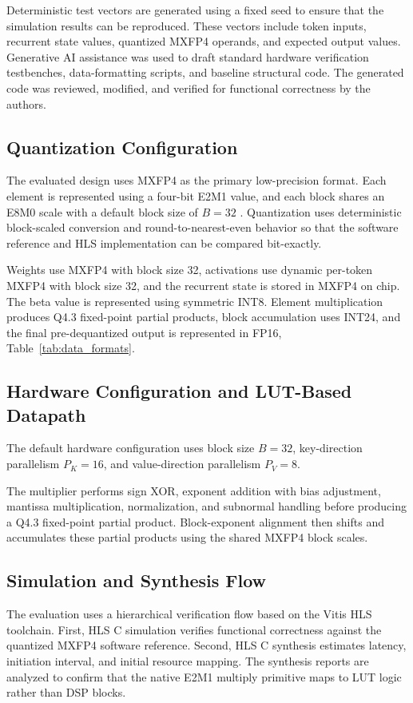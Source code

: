 ﻿\documentclass[conference]{IEEEtran}
\begin{document}
Deterministic test vectors are generated using a fixed seed to ensure that the simulation results can be reproduced. These vectors include token inputs, recurrent state values, quantized MXFP4 operands, and expected output values. Generative AI assistance was used to draft standard hardware verification testbenches, data-formatting scripts, and baseline structural code. The generated code was reviewed, modified, and verified for functional correctness by the authors.

\subsection{Quantization Configuration}
The evaluated design uses MXFP4 as the primary low-precision format. Each element is represented using a four-bit E2M1 value, and each block shares an E8M0 scale with a default block size of $B=32$ \cite{b12}. Quantization uses deterministic block-scaled conversion and round-to-nearest-even behavior so that the software reference and HLS implementation can be compared bit-exactly.

Weights use MXFP4 with block size 32, activations use dynamic per-token MXFP4 with block size 32, and the recurrent state is stored in MXFP4 on chip. The beta value is represented using symmetric INT8. Element multiplication produces Q4.3 fixed-point partial products, block accumulation uses INT24, and the final pre-dequantized output is represented in FP16, Table~\ref{tab:data_formats}.

\subsection{Hardware Configuration and LUT-Based Datapath}
The default hardware configuration uses block size $B=32$, key-direction parallelism $P_K=16$, and value-direction parallelism $P_V=8$.

The multiplier performs sign XOR, exponent addition with bias adjustment, mantissa multiplication, normalization, and subnormal handling before producing a Q4.3 fixed-point partial product. Block-exponent alignment then shifts and accumulates these partial products using the shared MXFP4 block scales.

\subsection{Simulation and Synthesis Flow}
The evaluation uses a hierarchical verification flow based on the Vitis HLS toolchain. First, HLS C simulation verifies functional correctness against the quantized MXFP4 software reference. Second, HLS C synthesis estimates latency, initiation interval, and initial resource mapping. The synthesis reports are analyzed to confirm that the native E2M1 multiply primitive maps to LUT logic rather than DSP blocks.
\end{document}
